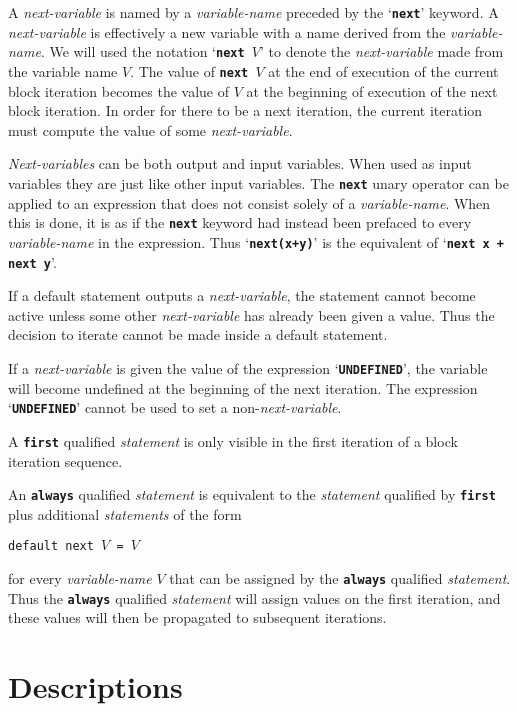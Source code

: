 \documentclass[12pt]{article}
\newcommand{\TT}[1]{{\tt \bfseries #1}}
\newcommand{\ttkey}[1]{{\tt \bfseries #1}}
\begin{document}
A {\em next-variable} is named by a {\em variable-name} preceded by
the `\ttkey{next}' keyword.  A {\em next-variable}
is effectively a new variable with a name derived from the
{\em variable-name}.  We will used the notation `\TT{next }$V$'
to denote the {\em next-variable} made from the variable name $V$.
The value of \TT{next }$V$ at the end of execution of the
current block iteration becomes the value of $V$ at the beginning
of execution of the next block iteration.  In order for there to be
a next iteration, the current iteration must compute the value of
some {\em next-variable}.

{\em Next-variables} can be both output and input variables.
When used as input variables they are just like other input variables.
The \TT{next} unary operator can be applied to an expression that does not
consist solely of a {\em variable-name}.  When this is done, it is
as if the \TT{next} keyword had instead been prefaced to every
{\em variable-name} in the expression.  Thus `\TT{next(x+y)}' is
the equivalent of `\TT{next x + next y}'.

If a default statement outputs a {\em next-variable}, the statement
cannot become active unless some other {\em next-variable} has already
been given a value.  Thus the decision to iterate cannot be made inside
a default statement.

If a {\em next-variable} is given the value of
the expression `\ttkey{UNDEFINED}',\label{UNDEFINED}
the variable will become undefined
at the beginning of the next iteration.
The expression `\TT{UNDEFINED}' cannot be used to set a
non-{\em next-variable}.

A \ttkey{first} qualified {\em statement} is only visible in the
first iteration of a block iteration sequence.

An \ttkey{always} qualified {\em statement} is equivalent to the {\em statement}
qualified by \TT{first} plus additional {\em statements} of the form

\begin{center}
\verb|default next |$V$\verb| = |$V$
\end{center}

for every {\em variable-name} $V$ that can be assigned by the
\TT{always} qualified {\em statement}.  Thus the
\TT{always} qualified {\em statement} will assign values on the first
iteration, and these values will then be propagated to subsequent iterations.


\section{Descriptions}
\label{DESCRIPTIONS}
\end{document}
